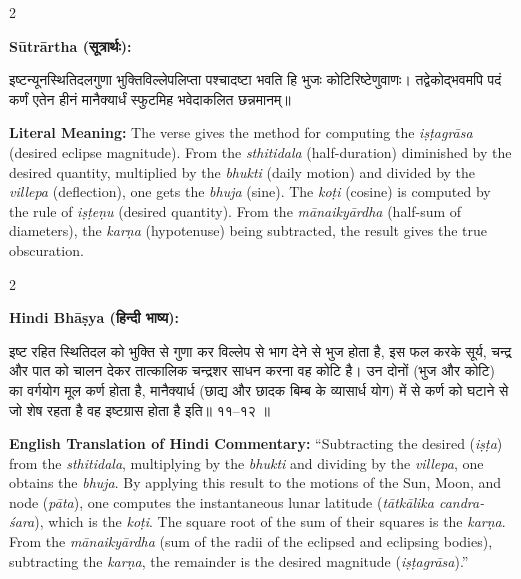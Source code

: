 \documentclass[11pt,a4paper]{article}
\newcommand{\dev}[1]{{\devanagarifont #1}}
\newenvironment{sanskritverse}{%
  \begin{center}\begin{minipage}{0.95\textwidth}
  \setlength{\leftskip}{1em}
  \setlength{\rightskip}{1em}
  \dev
}{\end{minipage}\end{center}}
\begin{document}
\vspace{0.5em}

\begin{paracol}{2}

\noindent\textbf{Sūtrārtha (\dev{सूत्रार्थः}):}
\begin{sanskritverse}
इष्टन्यूनस्थितिदलगुणा भुक्तिविल्लेपलिप्ता पश्चादष्टा भवति हि भुजः कोटिरिष्टेणुवाणः।
तद्वेकोद्भवमपि पदं कर्णं एतेन हीनं मानैक्यार्धं स्फुटमिह भवेदाकलित छन्नमानम्॥
\end{sanskritverse}

\switchcolumn

\textbf{Literal Meaning:} The verse gives the method for computing the \textit{iṣṭagrāsa} (desired eclipse magnitude). From the \textit{sthitidala} (half-duration) diminished by the desired quantity, multiplied by the \textit{bhukti} (daily motion) and divided by the \textit{villepa} (deflection), one gets the \textit{bhuja} (sine). The \textit{koṭi} (cosine) is computed by the rule of \textit{iṣṭeṇu} (desired quantity). From the \textit{mānaikyārdha} (half-sum of diameters), the \textit{karṇa} (hypotenuse) being subtracted, the result gives the true obscuration.

\end{paracol}

\vspace{0.5em}

\begin{paracol}{2}

\noindent\textbf{Hindi Bhāṣya (\dev{हिन्दी भाष्य}):}
\begin{sanskritverse}
इष्ट रहित स्थितिदल को भुक्ति से गुणा कर विल्लेप से भाग देने से भुज होता है, इस फल करके
सूर्य, चन्द्र और पात को चालन देकर तात्कालिक चन्द्रशर साधन करना वह कोटि है। उन दोनों
(भुज और कोटि) का वर्गयोग मूल कर्ण होता है, मानैक्यार्ध (छाद्य और छादक बिम्ब के व्यासार्ध
योग) में से कर्ण को घटाने से जो शेष रहता है वह इष्टग्रास होता है इति॥ ११--१२ ॥
\end{sanskritverse}

\switchcolumn

\textbf{English Translation of Hindi Commentary:} ``Subtracting the desired (\textit{iṣṭa}) from the \textit{sthitidala}, multiplying by the \textit{bhukti} and dividing by the \textit{villepa}, one obtains the \textit{bhuja}. By applying this result to the motions of the Sun, Moon, and node (\textit{pāta}), one computes the instantaneous lunar latitude (\textit{tātkālika candra-śara}), which is the \textit{koṭi}. The square root of the sum of their squares is the \textit{karṇa}. From the \textit{mānaikyārdha} (sum of the radii of the eclipsed and eclipsing bodies), subtracting the \textit{karṇa}, the remainder is the desired magnitude (\textit{iṣṭagrāsa}).''

\end{paracol}
\end{document}

